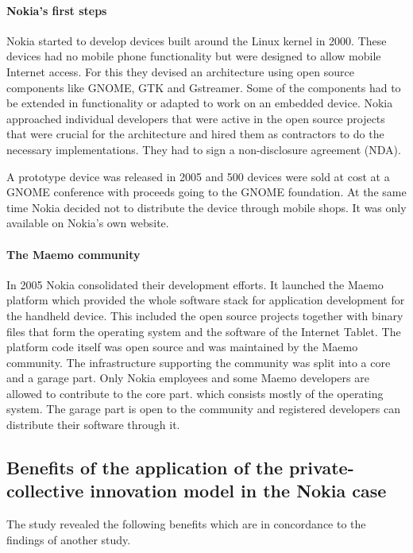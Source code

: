 \documentclass[a4paper]{scrartcl}
\begin{document}
\paragraph{Nokia's first steps}
Nokia started to develop devices built around the Linux kernel in 2000.
These devices had no mobile phone functionality but were designed to allow mobile Internet access.
For this they devised an architecture using open source components like GNOME, GTK and Gstreamer.
Some of the components had to be extended in functionality or adapted to work on an embedded device.
Nokia approached individual developers that were active in the open source projects that were crucial for the architecture and hired them as contractors to do the necessary implementations.
They had to sign a non-disclosure agreement (NDA).

A prototype device was released in 2005 and 500 devices were sold at cost at a GNOME conference with proceeds going to the GNOME foundation.
At the same time Nokia decided not to distribute the device through mobile shops.
It was only available on Nokia's own website.

\paragraph{The Maemo community}
In 2005 Nokia consolidated their development efforts.
It launched the Maemo platform which provided the whole software stack for application development for the handheld device.
This included the open source projects together with binary files that form the operating system and the software of the Internet Tablet.
The platform code itself was open source and was maintained by the Maemo community.
The infrastructure supporting the community was split into a core and a garage part.
Only Nokia employees and some Maemo developers are allowed to contribute to the core part. which consists mostly of the operating system.
The garage part is open to the community and registered developers can distribute their software through it.


\subsection{Benefits of the application of the private-collective innovation model in the Nokia case}

The study revealed the following benefits which are in concordance to the findings of another study\cite{von2009open}.
\end{document}
